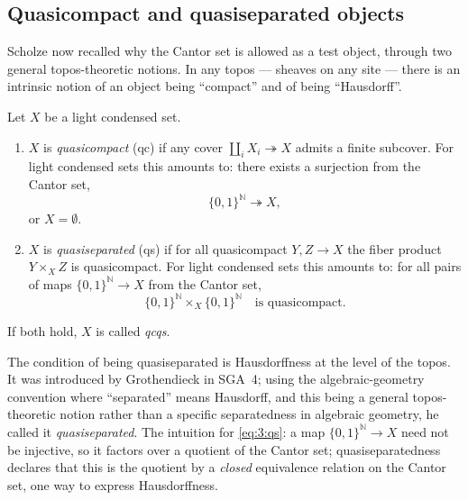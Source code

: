 \subsection{Quasicompact and quasiseparated objects}

Scholze now recalled why the Cantor set is allowed as a test object, through two
general topos-theoretic notions. In any topos --- sheaves on any site --- there
is an intrinsic notion of an object being ``compact'' and of being
``Hausdorff''.

\begin{definition}
\label{def:3:qc-qs}
Let $X$ be a light condensed set.
\begin{enumerate}
\item $X$ is \emph{quasicompact} (qc) if any cover
$\coprod_i X_i\twoheadrightarrow X$ admits a finite subcover. For light condensed
sets this amounts to: there exists a surjection from the Cantor set,
\begin{equation*}
\{0,1\}^{\mathbb{N}}\twoheadrightarrow X,
\end{equation*}
or $X=\emptyset$.
\item $X$ is \emph{quasiseparated} (qs) if for all quasicompact $Y,Z\to X$ the
fiber product $Y\times_X Z$ is quasicompact. For light condensed sets this
amounts to: for all pairs of maps $\{0,1\}^{\mathbb{N}}\to X$ from the Cantor
set,
\begin{equation}
\label{eq:3:qs}
\{0,1\}^{\mathbb{N}}\times_X\{0,1\}^{\mathbb{N}}\quad\text{is quasicompact.}
\end{equation}
\end{enumerate}
If both hold, $X$ is called \emph{qcqs}.
\end{definition}

\begin{remark}
\label{rmk:3:grothendieck-qs}
The condition of being quasiseparated is Hausdorffness at the level of the
topos. It was introduced by Grothendieck in SGA~4; using the algebraic-geometry
convention where ``separated'' means Hausdorff, and this being a general
topos-theoretic notion rather than a specific separatedness in algebraic
geometry, he called it \emph{quasiseparated}. The intuition for
\eqref{eq:3:qs}: a map $\{0,1\}^{\mathbb{N}}\to X$ need not be injective, so it
factors over a quotient of the Cantor set; quasiseparatedness declares that this
is the quotient by a \emph{closed} equivalence relation on the Cantor set, one
way to express Hausdorffness.
\end{remark}

